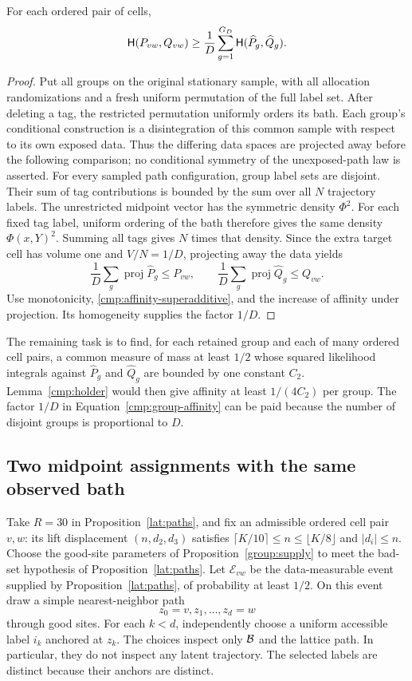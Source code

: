 \begin{lemma}\label{cmp:tag-normalization}
For each ordered pair of cells,
\begin{equation}\label{cmp:group-affinity}
 \mathsf H(P_{vw},Q_{vw})
 \ge\frac1D\sum_{g=1}^{G_D}\mathsf H(\widehat P_g,\widehat Q_g).
\end{equation}
\end{lemma}
\begin{proof}
Put all groups on the original stationary sample, with all allocation
randomizations and a fresh uniform permutation of the full label set.
After deleting a tag, the restricted permutation uniformly orders its bath.
Each group's conditional construction is a disintegration of this common
sample with respect to its own exposed data. Thus the differing data spaces
are projected away before the following comparison; no conditional symmetry
of the unexposed-path law is asserted.
For every sampled path configuration, group label sets are disjoint. Their
sum of tag contributions is bounded by the sum over all $N$ trajectory
labels. The unrestricted midpoint vector has the symmetric density $\Phi^2$.
For each fixed tag label, uniform ordering of the bath therefore gives the
same density $\Phi(x,Y)^2$. Summing all tags gives $N$ times that density.
Since the extra target cell has volume one and $V/N=1/D$, projecting away
the data yields
\[
 \frac1D\sum_g\operatorname{proj}\widehat P_g\le P_{vw},
 \qquad
 \frac1D\sum_g\operatorname{proj}\widehat Q_g\le Q_{vw}.
\]
Use monotonicity, \eqref{cmp:affinity-superadditive}, and the increase of
affinity under projection. Its homogeneity supplies the factor $1/D$.
\end{proof}

The remaining task is to find, for each retained group and each of many
ordered cell pairs, a common measure of mass at least $1/2$ whose squared
likelihood integrals against $\widehat P_g$ and $\widehat Q_g$ are bounded
by one constant $C_2$. Lemma~\ref{cmp:holder} would then give affinity at
least $1/(4C_2)$ per group. The factor $1/D$ in
Equation~\eqref{cmp:group-affinity} can be paid because the number of
disjoint groups is proportional to $D$.

\subsection{Two midpoint assignments with the same observed bath}

Take $R=30$ in Proposition~\ref{lat:paths}, and fix an admissible
ordered cell pair $v,w$: its lift displacement $(n,d_2,d_3)$ satisfies
$\lceil K/10\rceil\le n\le\lfloor K/8\rfloor$ and $|d_i|\le n$.
Choose the good-site
parameters of Proposition~\ref{group:supply} to meet the bad-set hypothesis
of Proposition~\ref{lat:paths}. Let $\mathcal E_{vw}$ be the data-measurable
event supplied by Proposition~\ref{lat:paths}, of probability at least $1/2$. On this event draw a simple nearest-neighbor
path
\[
 z_0=v,z_1,\ldots,z_d=w
\]
through good sites. For each $k<d$, independently choose a uniform accessible
label $i_k$ anchored at $z_k$. The choices inspect only $\mathcal B$ and the lattice
path. In particular, they do not inspect any latent trajectory. The selected
labels are distinct because their anchors are distinct.


